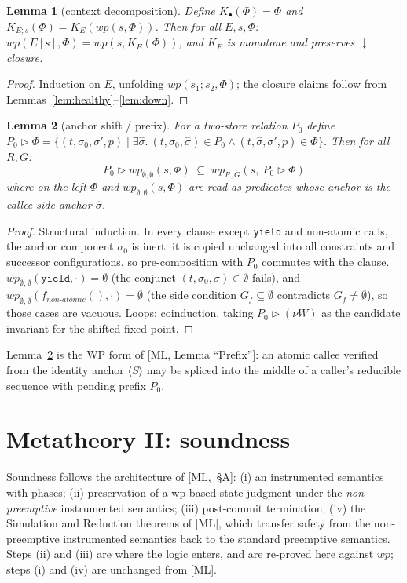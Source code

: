 \documentclass[11pt]{article}
\theoremstyle{plain}
\newtheorem{lemma}{Lemma}
\theoremstyle{plain}
\theoremstyle{definition}
\newcommand{\wpx}{\mathit{wp}}
\newcommand{\one}[1]{\langle #1\rangle}
\newcommand{\dcl}{\ensuremath{\downarrow}\text{-closed}}
\newcommand{\anchorshift}{\triangleright}
\newcommand{\tyield}{\mathtt{yield}}
\newcommand{\code}[1]{\texttt{#1}}
\begin{document}
\begin{lemma}[context decomposition]\label{lem:ctxt}
Define $K_\bullet(\Phi)=\Phi$ and $K_{E;s}(\Phi) = K_E(\wpx(s,\Phi))$. Then for all
$E,s,\Phi$: $\wpx(E[s],\Phi) = \wpx(s, K_E(\Phi))$, and $K_E$ is monotone and
preserves \dcl{} closure.
\end{lemma}
\begin{proof}
Induction on $E$, unfolding $\wpx(s_1;s_2,\Phi)$; the closure claims follow from
Lemmas~\ref{lem:healthy}--\ref{lem:down}.
\end{proof}

\begin{lemma}[anchor shift / prefix]\label{lem:prefix}
For a two-store relation $P_0$ define
$P_0\anchorshift\Phi = \{(t,\sigma_0,\sigma',p)\mid \exists\hat\sigma.\
(t,\sigma_0,\hat\sigma)\in P_0 \wedge (t,\hat\sigma,\sigma',p)\in\Phi\}$. Then for
all $R,G$:
\[
P_0 \anchorshift \wpx_{\emptyset,\emptyset}(s,\Phi)
\;\subseteq\;
\wpx_{R,G}(s,\ P_0\anchorshift\Phi)
\]
where on the left $\Phi$ and $\wpx_{\emptyset,\emptyset}(s,\Phi)$ are read as
predicates whose anchor is the \emph{callee-side} anchor $\hat\sigma$.
\end{lemma}
\begin{proof}
Structural induction. In every clause except \code{yield} and non-atomic calls,
the anchor component $\sigma_0$ is inert: it is copied unchanged into all
constraints and successor configurations, so pre-composition with $P_0$ commutes
with the clause. $\wpx_{\emptyset,\emptyset}(\tyield,\cdot)=\emptyset$ (the
conjunct $(t,\sigma_0,\sigma)\in\emptyset$ fails), and
$\wpx_{\emptyset,\emptyset}(f_{\mathit{non\text{-}atomic}}(),\cdot)=\emptyset$ (the
side condition $G_f\subseteq\emptyset$ contradicts $G_f\neq\emptyset$), so those
cases are vacuous. Loops: coinduction, taking $P_0\anchorshift(\nu W)$ as the
candidate invariant for the shifted fixed point.
\end{proof}

Lemma~\ref{lem:prefix} is the WP form of [ML, Lemma ``Prefix'']: an atomic callee
verified from the identity anchor $\one{S}$ may be spliced into the middle of a
caller's reducible sequence with pending prefix $P_0$.

\section{Metatheory II: soundness}\label{sec:meta2}

Soundness follows the architecture of [ML,~\S A]: (i) an instrumented semantics
with phases; (ii) preservation of a wp-based state judgment under the
\emph{non-preemptive} instrumented semantics; (iii) post-commit termination; (iv)
the Simulation and Reduction theorems of [ML], which transfer safety from the
non-preemptive instrumented semantics back to the standard preemptive semantics.
Steps (ii) and (iii) are where the logic enters, and are re-proved here against
$\wpx$; steps (i) and (iv) are unchanged from [ML].
\end{document}
